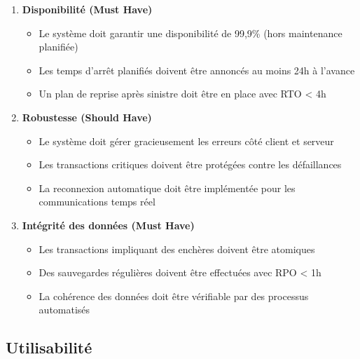 \begin{enumerate}
    \item \textbf{Disponibilité (Must Have)}
    \begin{itemize}
        \item Le système doit garantir une disponibilité de 99,9\% (hors maintenance planifiée)
        \item Les temps d'arrêt planifiés doivent être annoncés au moins 24h à l'avance
        \item Un plan de reprise après sinistre doit être en place avec RTO < 4h
    \end{itemize}
    
    \item \textbf{Robustesse (Should Have)}
    \begin{itemize}
        \item Le système doit gérer gracieusement les erreurs côté client et serveur
        \item Les transactions critiques doivent être protégées contre les défaillances
        \item La reconnexion automatique doit être implémentée pour les communications temps réel
    \end{itemize}
    
    \item \textbf{Intégrité des données (Must Have)}
    \begin{itemize}
        \item Les transactions impliquant des enchères doivent être atomiques
        \item Des sauvegardes régulières doivent être effectuées avec RPO < 1h
        \item La cohérence des données doit être vérifiable par des processus automatisés
    \end{itemize}
\end{enumerate}

\subsection{Utilisabilité}

